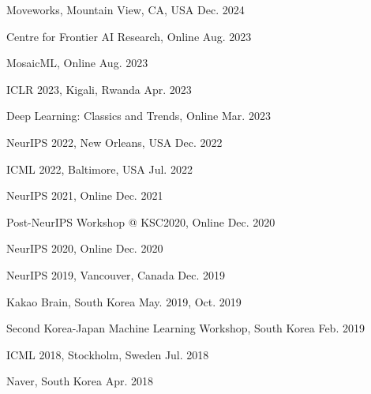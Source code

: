 
\vspace{5pt}

\vspace{-5pt}
\begin{cvhonors}
  \cvitem
    {Moveworks, Mountain View, CA, USA} %
    {Dec. 2024} %

  \cvitem
    {Centre for Frontier AI Research, Online} %
    {Aug. 2023} %

  \cvitem
    {MosaicML, Online} %
    {Aug. 2023} %

  \cvitem
    {ICLR 2023, Kigali, Rwanda} %
    {Apr. 2023} %

  \cvitem
    {Deep Learning: Classics and Trends, Online} %
    {Mar. 2023} %

  \cvitem
    {NeurIPS 2022, New Orleans, USA} %
    {Dec. 2022} %

  \cvitem
    {ICML 2022, Baltimore, USA} %
    {Jul. 2022} %

  \cvitem
    {NeurIPS 2021, Online} %
    {Dec. 2021} %

  \cvitem
    {Post-NeurIPS Workshop @ KSC2020, Online} %
    {Dec. 2020} %

  \cvitem
    {NeurIPS 2020, Online} %
    {Dec. 2020} %

  \cvitem
    {NeurIPS 2019, Vancouver, Canada} %
    {Dec. 2019} %

  \cvitem
    {Kakao Brain, South Korea}%
    {May. 2019, Oct. 2019} %

  \cvitem
    {Second Korea-Japan Machine Learning Workshop, South Korea} %
    {Feb. 2019} %

  \cvitem
    {ICML 2018, Stockholm, Sweden} %
    {Jul. 2018} %

  \cvitem
    {Naver, South Korea} %
    {Apr. 2018} %

\end{cvhonors}

